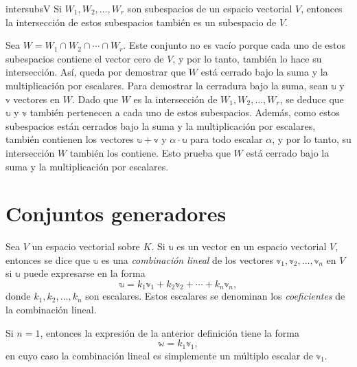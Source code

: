 \newpage

\begin{theorem}{}{intersubsV}
    Si $W_1, W_2, \dots, W_r$ son subespacios de un espacio vectorial $V$, entonces la intersección de estos subespacios también es un subespacio de $V$.

    \tcblower
    \demostracion Sea $W = W_1 \cap W_2 \cap \cdots \cap W_r$. Este conjunto no es vacío porque cada uno de estos subespacios contiene el vector cero de $V$, y por lo tanto, también lo hace su intersección. Así, queda por demostrar que $W$ está cerrado bajo la suma y la multiplicación por escalares. Para demostrar la cerradura bajo la suma, sean $\mathbb{u}$ y $\mathbb{v}$ vectores en $W$. Dado que $W$ es la intersección de $W_1, W_2, \dots, W_r$, se deduce que $\mathbb{u}$ y $\mathbb{v}$ también pertenecen a cada uno de estos subespacios. Además, como estos subespacios están cerrados bajo la suma y la multiplicación por escalares, también contienen los vectores $\mathbb{u} + \mathbb{v}$ y $\alpha \cdot \mathbb{u}$ para todo escalar $\alpha$, y por lo tanto, su intersección $W$ también los contiene. Esto prueba que $W$ está cerrado bajo la suma y la multiplicación por escalares.
\end{theorem}

\section{Conjuntos generadores}

\begin{definicion}{}{}
    Sea $V$ un espacio vectorial sobre $K$. Si $\mathbb{u}$ es un vector en un espacio vectorial $V$, entonces se dice que $\mathbb{u}$ es una \emph{combinación lineal} de los vectores $\mathbb{v}_1, \mathbb{v}_2, \dots, \mathbb{v}_n$ en $V$ si $\mathbb{u}$ puede expresarse en la forma
    $$\mathbb{u} = k_1 \mathbb{v}_1 + k_2 \mathbb{v}_2 + \cdots + k_n \mathbb{v}_n,$$
    donde $k_1, k_2, \dots, k_n$ son escalares. Estos escalares se denominan los \emph{coeficientes} de la combinación lineal.
\end{definicion}

Si $n = 1$, entonces la expresión de la anterior definición tiene la forma
$$\mathbb{w} = k_1\mathbb{v}_1,$$
en cuyo caso la combinación lineal es simplemente un múltiplo escalar de $\mathbb{v}_1$.

